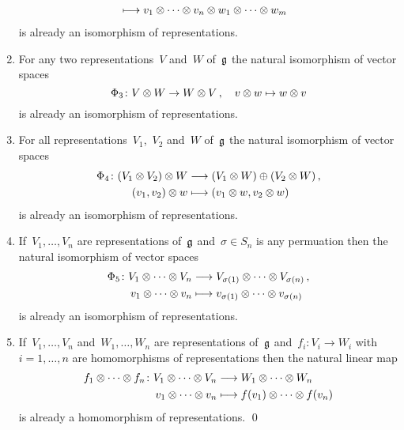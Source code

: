 \begin{proposition}
\begin{enumerate}
\begin{align*}
        &\longmapsto
        v_1 \otimes \dotsb \otimes v_n \otimes w_1 \otimes \dotsb \otimes w_m
      \end{align*}
      is already an isomorphism of representations.
    \item
      For any two representations~$V$ and~$W$ of~$\mathfrak{g}$ the natural isomorphism of vector spaces
      \[
        \Phi_3
        \colon
        V \otimes W
        \to
        W \otimes V \,,
        \quad
        v \otimes w
        \mapsto
        w \otimes v
      \]
      is already an isomorphism of representations.
    \item
      For all representations~$V_1$,~$V_2$ and~$W$ of~$\mathfrak{g}$ the natural isomorphism of vector spaces
      \begin{align*}
        \Phi_4
        \colon
        (V_1 \otimes V_2) \otimes W
        &\longrightarrow
        (V_1 \otimes W) \oplus (V_2 \otimes W) \,,
        \\
        (v_1, v_2) \otimes w
        &\longmapsto
        (v_1 \otimes w, v_2 \otimes w)
      \end{align*}
      is already an isomorphism of representations.
    \item
      If~$V_1, \dotsc, V_n$ are representations of~$\mathfrak{g}$ and~$\sigma \in S_n$ is any permuation then the natural isomorphism of vector spaces
      \begin{align*}
        \Phi_5
        \colon 
        V_1 \otimes \dotsb \otimes V_n
        &\longrightarrow
        V_{\sigma(1)} \otimes \dotsb \otimes V_{\sigma(n)} \,,
        \\
        v_1 \otimes \dotsb \otimes v_n
        &\longmapsto
        v_{\sigma(1)} \otimes \dotsb \otimes v_{\sigma(n)}
      \end{align*}
      is already an isomorphism of representations.
    \item
      If~$V_1, \dotsc, V_n$ and~$W_1, \dotsc, W_n$ are representations of~$\mathfrak{g}$ and~$f_i \colon V_i \to W_i$ with~$i = 1, \dotsc, n$ are homomorphisms of representations then the natural linear map
      \begin{align*}
        f_1 \otimes \dotsb \otimes f_n
        \colon
        V_1 \otimes \dotsb \otimes V_n
        &\longrightarrow
        W_1 \otimes \dotsb \otimes W_n
        \\
        v_1 \otimes \dotsb \otimes v_n
        &\longmapsto
        f(v_1) \otimes \dotsb \otimes f(v_n)
      \end{align*}
      is already a homomorphism of representations.
    \qed
  \end{enumerate}
\end{proposition}


